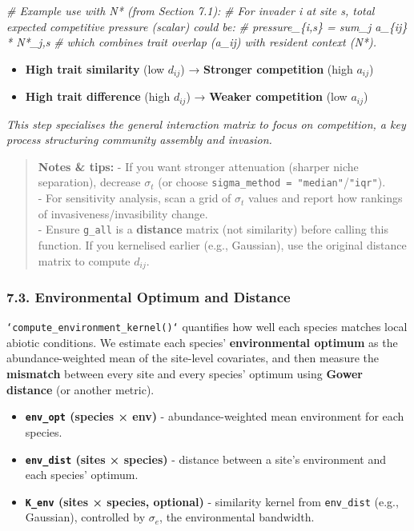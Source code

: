\documentclass[
]{article}
\newenvironment{Shaded}{\begin{snugshade}}{\end{snugshade}}
\newcommand{\CommentTok}[1]{\textcolor[rgb]{0.56,0.35,0.01}{\textit{#1}}}
\providecommand{\tightlist}{%
  \setlength{\itemsep}{0pt}\setlength{\parskip}{0pt}}
\begin{document}
\begin{Shaded}
\begin{Highlighting}[]
\CommentTok{\# Example use with N* (from Section 7.1):}
\CommentTok{\# For invader i at site s, total expected competitive pressure (scalar) could be:}
\CommentTok{\#   pressure\_\{i,s\} = sum\_j a\_\{ij\} * N*\_j,s}
\CommentTok{\# which combines trait overlap (a\_ij) with resident context (N*).}
\end{Highlighting}
\end{Shaded}

\begin{itemize}
\tightlist
\item
  \textbf{High trait similarity} (low \(d_{ij}\)) → \textbf{Stronger
  competition} (high \(a_{ij}\))
\item
  \textbf{High trait difference} (high \(d_{ij}\)) → \textbf{Weaker
  competition} (low \(a_{ij}\))
\end{itemize}

\emph{This step specialises the general interaction matrix to focus on
competition, a key process structuring community assembly and invasion.}

\begin{quote}
\textbf{Notes \& tips:} - If you want stronger attenuation (sharper
niche separation), decrease \(\sigma_t\) (or choose
\texttt{sigma\_method\ =\ "median"}/\texttt{"iqr"}).\\
- For sensitivity analysis, scan a grid of \(\sigma_t\) values and
report how rankings of invasiveness/invasibility change.\\
- Ensure \texttt{g\_all} is a \textbf{distance} matrix (not similarity)
before calling this function. If you kernelised earlier (e.g.,
Gaussian), use the original distance matrix to compute \(d_{ij}\).
\end{quote}

\hypertarget{environmental-optimum-and-distance}{%
\subsubsection{7.3. Environmental Optimum and
Distance}\label{environmental-optimum-and-distance}}

\texttt{`compute_environment_kernel()`} quantifies how well each species
matches local abiotic conditions. We estimate each species'
\textbf{environmental optimum} as the abundance-weighted mean of the
site-level covariates, and then measure the \textbf{mismatch} between
every site and every species' optimum using \textbf{Gower distance} (or
another metric).

\begin{itemize}
\tightlist
\item
  \textbf{\texttt{env\_opt} (species × env)} - abundance-weighted mean
  environment for each species.
\item
  \textbf{\texttt{env\_dist} (sites × species)} - distance between a
  site's environment and each species' optimum.
\item
  \textbf{\texttt{K\_env} (sites × species, optional)} - similarity
  kernel from \texttt{env\_dist} (e.g., Gaussian), controlled by
  \textbf{\(\sigma_e\)}, the environmental bandwidth.
\end{itemize}
\end{document}
